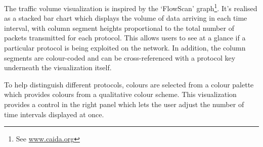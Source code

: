 The traffic volume visualization is inspired by the `FlowScan'
graph\footnote{See \url{www.caida.org}}.
It's realised as a stacked bar chart which displays the volume of data arriving
in each time interval, with column segment heights proportional to the total
number of packets transmitted for each protocol. This allows users to see at a
glance if a particular protocol is being exploited on the network. In addition,
the column segments are colour-coded and can be cross-referenced with a
protocol key underneath the visualization itself.

To help distinguish different protocols, colours are selected from a colour
palette which provides colours from a qualitative colour scheme.
This visualization provides a control in the right panel which lets the user
adjust the number of time intervals displayed at once.
